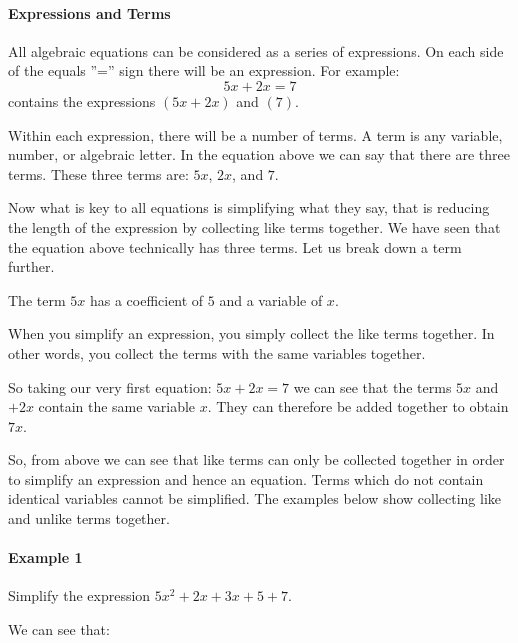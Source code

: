 \paragraph{Expressions and Terms}



All algebraic equations can be considered as a series of expressions. On each side of the equals ''='' sign there will be an expression. For example:
$$
5x + 2x = 7
$$
contains the expressions $(5x + 2x)$ and $(7)$.



Within each expression, there will be a number of terms. A term is any variable, number, or algebraic letter. In the equation above we can say that there are three terms. These three terms are: $5x$, $2x$, and $7$.



Now what is key to all equations is simplifying what they say, that is reducing the length of the expression by collecting like terms together. We have seen that the equation above technically has three terms. Let us break down a term further.



The term $5x$ has a coefficient of $5$ and a variable of $x$.



When you simplify an expression, you simply collect the like terms together. In other words, you collect the terms with the same variables together.



So taking our very first equation: $5x + 2x = 7$ we can see that the terms $5x$ and $+2x$ contain the same variable $x$. They can therefore be added together to obtain $7x$.



So, from above we can see that like terms can only be collected together in order to simplify an expression and hence an equation. Terms which do not contain identical variables cannot be simplified. The examples below show collecting like and unlike terms together.



\paragraph{Example 1}



Simplify the expression $5x^2 + 2x + 3x + 5 + 7$.



We can see that:



